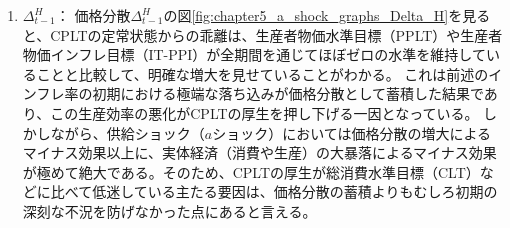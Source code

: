 \begin{enumerate}
        総消費水準目標（CLT）が初期に大きなプラス方向へのスパイクを記録しているのと同様に、CPLTも供給ショックの直接的な影響を受けてショック直後にプラス方向（インフレ）へ鋭くスパイクしている。
        しかし、その後消費者物価を目標水準に引き戻そうとする強力な金融引き締めメカニズムが働くため、インフレ率は直ちに急反落し、極端なマイナス方向（デフレ）へと深く落ち込んでいる。この初期から中盤にかけてのインフレ率の激しい乱高下が次項で述べる価格分散の蓄積をもたらし、結果として厚生を悪化させる要因となっている。
    \item
    \label{itm:chapter5_a_shock_policies_cplt_Delta_t_minus_1_H}
        \(\Delta_{t-1}^H\)：
        価格分散\(\Delta_{t-1}^H\)の図\ref{fig:chapter5_a_shock_graphs_Delta_H}を見ると、CPLTの定常状態からの乖離は、生産者物価水準目標（PPLT）や生産者物価インフレ目標（IT-PPI）が全期間を通じてほぼゼロの水準を維持していることと比較して、明確な増大を見せていることがわかる。
        これは前述のインフレ率の初期における極端な落ち込みが価格分散として蓄積した結果であり、この生産効率の悪化がCPLTの厚生を押し下げる一因となっている。
        しかしながら、供給ショック（\(a\)ショック）においては価格分散の増大によるマイナス効果以上に、実体経済（消費や生産）の大暴落によるマイナス効果が極めて絶大である。そのため、CPLTの厚生が総消費水準目標（CLT）などに比べて低迷している主たる要因は、価格分散の蓄積よりもむしろ初期の深刻な不況を防げなかった点にあると言える。
\end{enumerate}